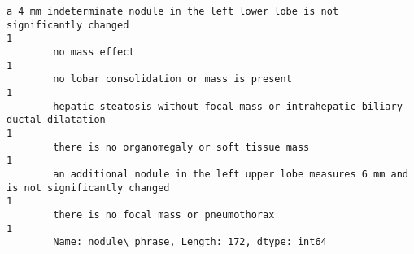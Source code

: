 \documentclass[11pt]{article}
\begin{document}
\begin{Verbatim}[commandchars=\\\{\}]
        a 4 mm indeterminate nodule in the left lower lobe is not significantly changed                                                                                                                                                                                                                                                                                                                                                 1
        no mass effect                                                                                                                                                                                                                                                                                                                                                                                                                  1
        no lobar consolidation or mass is present                                                                                                                                                                                                                                                                                                                                                                                       1
        hepatic steatosis without focal mass or intrahepatic biliary ductal dilatation                                                                                                                                                                                                                                                                                                                                                  1
        there is no organomegaly or soft tissue mass                                                                                                                                                                                                                                                                                                                                                                                    1
        an additional nodule in the left upper lobe measures 6 mm and is not significantly changed                                                                                                                                                                                                                                                                                                                                      1
        there is no focal mass or pneumothorax                                                                                                                                                                                                                                                                                                                                                                                          1
        Name: nodule\_phrase, Length: 172, dtype: int64
\end{Verbatim}
            
\end{document}
